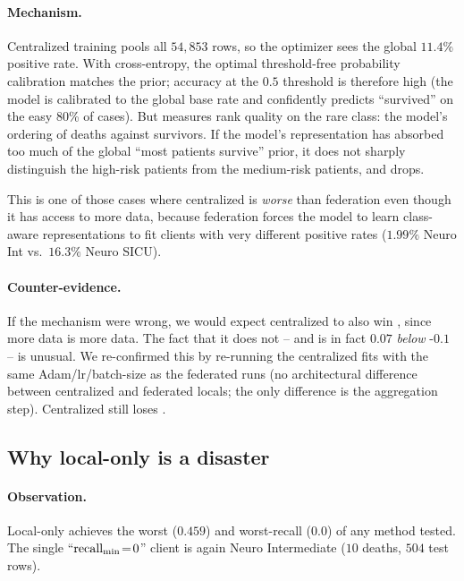\paragraph{Mechanism.} Centralized training pools all $54{,}853$ rows, so the
optimizer sees the global $11.4\%$ positive rate. With cross-entropy, the
optimal threshold-free probability calibration matches the prior; accuracy at
the $0.5$ threshold is therefore high (the model is calibrated to the global
base rate and confidently predicts ``survived'' on the easy 80\% of cases).
But \auprc{} measures rank quality on the rare class: the model's
ordering of deaths against survivors. If the model's representation has
absorbed too much of the global ``most patients survive'' prior, it does not
sharply distinguish the high-risk patients from the medium-risk patients,
and \auprc{} drops.

This is one of those cases where centralized is \emph{worse} than federation
even though it has access to more data, because federation forces the model
to learn class-aware representations to fit clients with very different
positive rates ($1.99\%$ Neuro Int vs.\ $16.3\%$ Neuro SICU).

\paragraph{Counter-evidence.} If the mechanism were wrong, we would expect
centralized to also win \auprc{}, since more data is more data. The fact
that it does not -- and is in fact $0.07$ \emph{below} \fedprox{}-$0.1$ --
is unusual. We re-confirmed this by re-running the centralized fits with the
same Adam/lr/batch-size as the federated runs (no architectural difference
between centralized and federated locals; the only difference is the
aggregation step). Centralized still loses \auprc{}.

\subsection{Why local-only is a disaster}
\label{sec:mechanism-local}

\paragraph{Observation.} Local-only achieves the worst \auprc{} ($0.459$) and
worst-recall ($0.0$) of any method tested. The single ``$\text{recall}_{\min}{}\!=\!0$''
client is again Neuro Intermediate ($10$ deaths, $504$ test rows).

